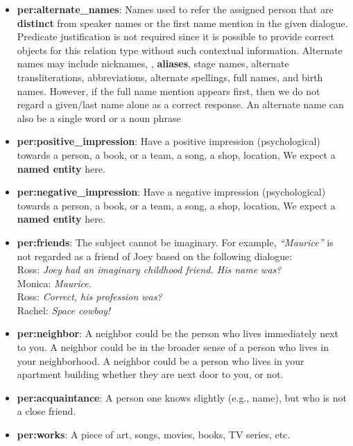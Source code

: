 \documentclass[11pt,a4paper]{article}
\begin{document}
\iffalse
\begin{itemize}
    \item \textbf{per:alternate\_names}: Names used to refer the assigned person that are \textbf{distinct} from speaker names or the first name mention in the given dialogue. Predicate justification is not required since it is possible to provide correct objects for this relation type without such contextual information. Alternate names may include nicknames, , \textbf{aliases}, stage names, alternate transliterations, abbreviations, alternate spellings, full names, and birth names. However, if the full name mention appears first, then we do not regard a given/last name alone as a correct response. An alternate name can also be a single word or a noun phrase


    \item \textbf{per:positive\_impression}: Have a positive impression (psychological) towards a person, a book, or a team, a song, a shop, location, We expect a \textbf{named entity} here.

    \item \textbf{per:negative\_impression}: Have a negative impression (psychological) towards a person, a book, or a team, a song, a shop, location, We expect a \textbf{named entity} here. 

    \item \textbf{per:friends}: The subject cannot be imaginary. For example, \emph{``Maurice''} is not regarded as a friend of Joey based on the following dialogue: \\
    Ross: \emph{Joey had an imaginary childhood friend. His name was?}\\
    Monica: \emph{Maurice.}\\
    Ross: \emph{Correct, his profession was?}\\
    Rachel: \emph{Space cowboy!}




    \item \textbf{per:neighbor}: A neighbor could be the person who lives immediately next to you. A neighbor could be in the broader sense of a person who lives in your neighborhood. A neighbor could be a person who lives in your apartment building whether they are next door to you, or not. 


    \item \textbf{per:acquaintance}: A person one knows slightly (e.g., name), but who is not a close friend.

    \item \textbf{per:works}: A piece of art, songs, movies, books, TV series, etc.




\end{itemize}
\end{document}
